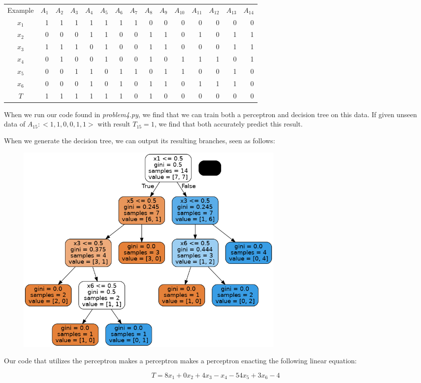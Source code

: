 \documentclass{article}
\begin{document}
\begin{center}
    \begin{tabular}{c r r r r r r r r r r r r r r}
        Example & $A_1$ & $A_2$ & $A_3$ & $A_4$ & $A_5$ & $A_6$ & $A_7$ & $A_8$ & $A_9$ & $A_10$ & $A_11$ & $A_12$ & $A_13$ & $A_14$ \\
        $x_1$ & 1 & 1 & 1 & 1 & 1 & 1 & 1 & 0 & 0 & 0 & 0 & 0 & 0 & 0 \\
        $x_2$ & 0 & 0 & 0 & 1 & 1 & 0 & 0 & 1 & 1 & 0 & 1 & 0 & 1 & 1 \\
        $x_3$ & 1 & 1 & 1 & 0 & 1 & 0 & 0 & 1 & 1 & 0 & 0 & 0 & 1 & 1 \\
        $x_4$ & 0 & 1 & 0 & 0 & 1 & 0 & 0 & 1 & 0 & 1 & 1 & 1 & 0 & 1 \\
        $x_5$ & 0 & 0 & 1 & 1 & 0 & 1 & 1 & 0 & 1 & 1 & 0 & 0 & 1 & 0 \\
        $x_6$ & 0 & 0 & 0 & 1 & 0 & 1 & 0 & 1 & 1 & 0 & 1 & 1 & 1 & 0 \\
        $T$ & 1 & 1 & 1 & 1 & 1 & 1 & 0 & 1 & 0 & 0 & 0 & 0 & 0 & 0 \\

    \end{tabular}
\end{center}

When we run our code found in \textit{problem4.py}, we find that we can train both a perceptron and decision tree on this data. If given unseen data of $A_{15}:<1, 1, 0, 0, 1, 1>$ with result $T_{15}=1$, we find that both accurately predict this result.

When we generate the decision tree, we can output its resulting branches, seen as follows:

\begin{figure}[H]
    \centering
    \includegraphics[width = 0.65\textwidth]{tree.png}
\end{figure}

Our code that utilizes the perceptron makes a perceptron makes a perceptron enacting the following linear equation:

\begin{equation}
    T = 8x_1 + 0x_2 + 4x_3 - x_4 -5 4x_5 + 3x_6 - 4
\end{equation}
\end{document}
